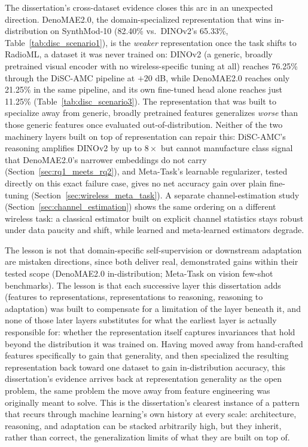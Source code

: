 The dissertation's cross-dataset evidence closes this arc in an unexpected direction. DenoMAE2.0, the domain-specialized representation that wins in-distribution on SynthMod-10 (82.40\% vs.\ DINOv2's 65.33\%, Table~\ref{tab:disc_scenario1}), is the \emph{weaker} representation once the task shifts to RadioML, a dataset it was never trained on: DINOv2 (a generic, broadly pretrained visual encoder with no wireless-specific tuning at all) reaches 76.25\% through the DiSC-AMC pipeline at $+20$ dB, while DenoMAE2.0 reaches only 21.25\% in the same pipeline, and its own fine-tuned head alone reaches just 11.25\% (Table~\ref{tab:disc_scenario3}). The representation that was built to specialize away from generic, broadly pretrained features generalizes \emph{worse} than those generic features once evaluated out-of-distribution. Neither of the two machinery layers built on top of representation can repair this: DiSC-AMC's reasoning amplifies DINOv2 by up to $8\times$ but cannot manufacture class signal that DenoMAE2.0's narrower embeddings do not carry (Section~\ref{sec:rq1_meets_rq2}), and Meta-Task's learnable regularizer, tested directly on this exact failure case, gives no net accuracy gain over plain fine-tuning (Section~\ref{sec:wireless_meta_task}). A separate channel-estimation study (Section~\ref{sec:channel_estimation}) shows the same ordering on a different wireless task: a classical estimator built on explicit channel statistics stays robust under data paucity and shift, while learned and meta-learned estimators degrade.

The lesson is not that domain-specific self-supervision or downstream adaptation are mistaken directions, since both deliver real, demonstrated gains within their tested scope (DenoMAE2.0 in-distribution; Meta-Task on vision few-shot benchmarks). The lesson is that each successive layer this dissertation adds (features to representations, representations to reasoning, reasoning to adaptation) was built to compensate for a limitation of the layer beneath it, and none of those later layers substitutes for what the earliest layer is actually responsible for: whether the representation itself captures invariances that hold beyond the distribution it was trained on. Having moved away from hand-crafted features specifically to gain that generality, and then specialized the resulting representation back toward one dataset to gain in-distribution accuracy, this dissertation's evidence arrives back at representation generality as the open problem, the same problem the move away from feature engineering was originally meant to solve. This is the dissertation's clearest instance of a pattern that recurs through machine learning's own history at every scale: architecture, reasoning, and adaptation can be stacked arbitrarily high, but they inherit, rather than correct, the generalization limits of what they are built on top of.

